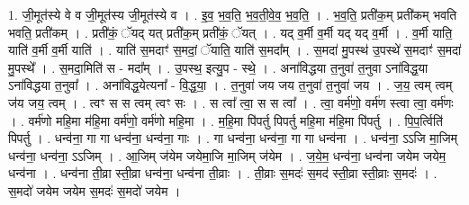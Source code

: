 \documentclass[17pt]{extarticle}
\begin{document}
1. जी॒मूत॑स्ये वे व जी॒मूत॑स्य जी॒मूत॑स्ये व । . इ॒व॒ भ॒व॒ति॒ भ॒व॒ती॒वे॒व॒ भ॒व॒ति॒ । . भ॒व॒ति॒ प्रती॑क॒म् प्रती॑कम् भवति भवति॒ प्रती॑कम् । . प्रती॑कं॒ ॅयद् यत् प्रती॑क॒म् प्रती॑कं॒ ॅयत् । . यद् व॒र्मी व॒र्मी यद् यद् व॒र्मी । . व॒र्मी याति॒ याति॑ व॒र्मी व॒र्मी याति॑ । . याति॑ स॒मदाꣳ॑ स॒मदां॒ ॅयाति॒ याति॑ स॒मदा᳚म् । . स॒मदा॑ मु॒पस्थ॑ उ॒पस्थे॑ स॒मदाꣳ॑ स॒मदा॑ मु॒पस्थे᳚ । . स॒मदा॒मिति॑ स - मदा᳚म् । . उ॒पस्थ॒ इत्यु॒प - स्थे॒ । . अना॑विद्धया त॒नुवा॑ त॒नुवा ऽना॑विद्ध॒या ऽना॑विद्धया त॒नुवा᳚ । . अना॑विद्ध॒येत्यना᳚ - वि॒द्ध॒या॒ । . त॒नुवा॑ जय जय त॒नुवा॑ त॒नुवा॑ जय । . ज॒य॒ त्वम् त्वम् ज॑य जय॒ त्वम् । . त्वꣳ स स त्वम् त्वꣳ सः । . स त्वा᳚ त्वा॒ स स त्वा᳚ । . त्वा॒ वर्म॑णो॒ वर्म॑ण स्त्वा त्वा॒ वर्म॑णः । . वर्म॑णो महि॒मा म॑हि॒मा वर्म॑णो॒ वर्म॑णो महि॒मा । . म॒हि॒मा पि॑पर्तु पिपर्तु महि॒मा म॑हि॒मा पि॑पर्तु । . पि॒प॒र्त्विति॑ पिपर्तु । . धन्व॑ना॒ गा गा धन्व॑ना॒ धन्व॑ना॒ गाः । . गा धन्व॑ना॒ धन्व॑ना॒ गा गा धन्व॑ना । . धन्व॑ना॒ ऽऽजि मा॒जिम् धन्व॑ना॒ धन्व॑ना॒ ऽऽजिम् । . आ॒जिम् ज॑येम जयेमा॒जि मा॒जिम् ज॑येम । . ज॒ये॒म॒ धन्व॑ना॒ धन्व॑ना जयेम जयेम॒ धन्व॑ना । . धन्व॑ना ती॒व्रा स्ती॒व्रा धन्व॑ना॒ धन्व॑ना ती॒व्राः । . ती॒व्राः स॒मदः॑ स॒मद॑ स्ती॒व्रा स्ती॒व्राः स॒मदः॑ । . स॒मदो॑ जयेम जयेम स॒मदः॑ स॒मदो॑ जयेम । \newline
\end{document}
